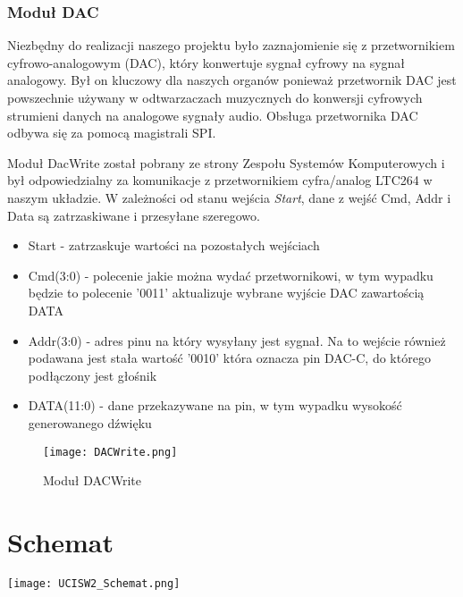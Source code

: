 \documentclass[11pt]{report}
\begin{document}
\subsubsection{Moduł DAC}
  \par Niezbędny do realizacji naszego projektu było zaznajomienie się z przetwornikiem cyfrowo-analogowym (DAC), który konwertuje sygnał cyfrowy na sygnał analogowy. Był on kluczowy dla naszych organów ponieważ przetwornik DAC jest powszechnie używany w odtwarzaczach muzycznych do konwersji cyfrowych strumieni danych na analogowe sygnały audio.
    Obsługa przetwornika DAC odbywa się za pomocą magistrali SPI.

	
    \par Moduł DacWrite został pobrany ze strony Zespołu Systemów Komputerowych i był odpowiedzialny za komunikacje z przetwornikiem cyfra/analog LTC264 w naszym układzie. W zależności od stanu wejścia \textit{Start}, dane z wejść Cmd, Addr i Data są zatrzaskiwane i przesyłane szeregowo.
    
    \vspace{10mm} 
    \begin{itemize}
		\item{Start - zatrzaskuje wartości na pozostałych wejściach}
	    \item{Cmd(3:0) - polecenie jakie można wydać przetwornikowi, w tym wypadku będzie to polecenie '0011' aktualizuje wybrane wyjście DAC zawartością DATA}
	    \item{Addr(3:0) - adres pinu na który wysyłany jest sygnał. Na to wejście również podawana jest stała wartość '0010' która oznacza pin DAC-C, do którego podłączony jest głośnik}
	    \item{DATA(11:0) - dane przekazywane na pin, w tym wypadku wysokość generowanego dźwięku}
	\end{itemize}

    \begin{figure}[h]
    	\centering
    	\texttt{[image: DACWrite.png]}
    	\caption{Moduł DACWrite}
	    \label{fig:1}
    \end{figure}
\newpage


\section{Schemat}

\begin{center}
 \texttt{[image: UCISW2\_Schemat.png]}
\end{center}
\newpage
    
\end{document}
